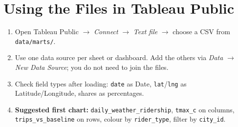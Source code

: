\documentclass[11pt,a4paper]{article}
\newcommand{\f}[1]{\texttt{\small #1}}
\begin{document}
\section{Using the Files in Tableau Public}
\begin{enumerate}
\item Open Tableau Public $\rightarrow$ \emph{Connect} $\rightarrow$ \emph{Text file} $\rightarrow$ choose a CSV from \f{data/marts/}.
\item Use one data source per sheet or dashboard. Add the others via \emph{Data} $\rightarrow$ \emph{New Data Source}; you do not need to join the files.
\item Check field types after loading: \f{date} as Date, \f{lat}/\f{lng} as Latitude/Longitude, shares as percentages.
\item \textbf{Suggested first chart:} \f{daily\_weather\_ridership}, \f{tmax\_c} on columns, \f{trips\_vs\_baseline} on rows, colour by \f{rider\_type}, filter by \f{city\_id}.
\end{enumerate}
\end{document}
